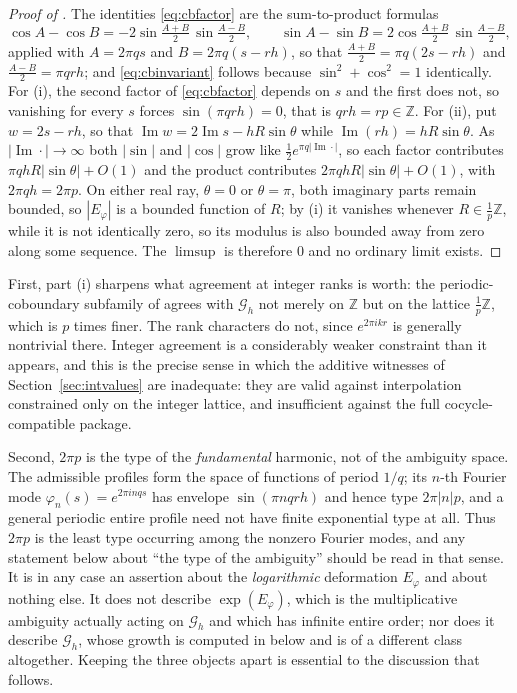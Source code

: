 \documentclass[11pt,letterpaper]{article}
\newcommand{\Gc}{\mathcal{G}}               %
\newcommand{\Zint}{\mathbb{Z}}
\begin{document}
\begin{proof}[Proof of ]
The identities \eqref{eq:cbfactor} are the sum-to-product formulas
\begin{equation*}
  \cos A-\cos B=-2\sin\tfrac{A+B}{2}\,\sin\tfrac{A-B}{2},
  \qquad
  \sin A-\sin B=2\cos\tfrac{A+B}{2}\,\sin\tfrac{A-B}{2},
\end{equation*}
applied with $A=2\pi qs$ and $B=2\pi q(s-rh)$, so that
$\tfrac{A+B}{2}=\pi q(2s-rh)$ and $\tfrac{A-B}{2}=\pi qrh$;
and \eqref{eq:cbinvariant} follows because
$\sin^2+\cos^2=1$ identically. For (i), the second factor of
\eqref{eq:cbfactor} depends on $s$ and the first does not, so vanishing for every
$s$ forces $\sin(\pi qrh)=0$, that is $qrh=rp\in\Zint$. For (ii), put
$w=2s-rh$, so that $\operatorname{Im}w=2\operatorname{Im}s-hR\sin\theta$ while
$\operatorname{Im}(rh)=hR\sin\theta$. As $|\operatorname{Im}\cdot|\to\infty$ both
$|\sin|$ and $|\cos|$ grow like $\tfrac12e^{\pi q|\operatorname{Im}\cdot|}$, so
each factor contributes $\pi qhR|\sin\theta|+O(1)$ and the product contributes
$2\pi qhR|\sin\theta|+O(1)$, with $2\pi qh=2\pi p$. On either real ray, $\theta=0$ or $\theta=\pi$, both imaginary parts remain
bounded, so $|E_\varphi|$ is a bounded function of $R$; by (i) it vanishes
whenever $R\in\tfrac1p\Zint$, while it is not identically zero, so its modulus is
also bounded away from zero along some sequence. The $\limsup$ is therefore $0$
and no ordinary limit exists.
\end{proof}

First, part (i) sharpens what agreement at
integer ranks is worth: the periodic-coboundary subfamily of
 agrees with $\Gc_h$ not merely on $\Zint$ but on the lattice
$\tfrac1p\Zint$, which is $p$ times finer. The rank characters do not, since
$e^{2\pi ikr}$ is generally nontrivial there. Integer agreement is a
considerably weaker constraint than it appears, and this is the precise sense in
which the additive witnesses of Section~\ref{sec:intvalues} are inadequate: they are
valid against interpolation constrained only on the integer lattice, and
insufficient against the full cocycle-compatible package.

Second, $2\pi p$ is the type of the \emph{fundamental} harmonic, not of the
ambiguity space. The admissible profiles form the space of functions of period
$1/q$; its $n$-th Fourier mode $\varphi_n(s)=e^{2\pi i n q s}$ has envelope
$\sin(\pi n q rh)$ and hence type $2\pi|n|p$, and a general periodic entire
profile need not have finite exponential type at all. Thus $2\pi p$ is the least
type occurring among the nonzero Fourier modes, and any statement below about
``the type of the ambiguity'' should be read in that sense. It is in any case an
assertion about the \emph{logarithmic} deformation $E_\varphi$ and about nothing
else. It does not describe $\exp(E_\varphi)$, which
is the multiplicative ambiguity actually acting on $\Gc_h$ and which has infinite
entire order; nor does it describe $\Gc_h$, whose growth is computed in
 below and is of a different class altogether. Keeping the
three objects apart is essential to the discussion that follows.
\end{document}
